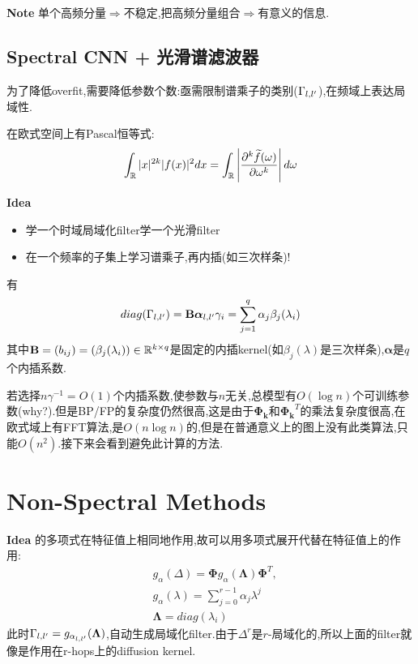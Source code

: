 \documentclass{article}
\begin{document}
\textbf{Note} 单个高频分量$\Rightarrow$不稳定,把高频分量组合$\Rightarrow$有意义的信息.

\subsection{Spectral CNN + 光滑谱滤波器}
为了降低overfit,需要降低参数个数:亟需限制谱乘子的类别($\Gamma_{l,l'}$),在频域上表达局域性.

在欧式空间上有Pascal恒等式:
\begin{align}
    \int_{\mathbb{R}}|x|^{2k}|f(x)|^2dx=\int_{\mathbb{R}}\left|\frac{\partial^k \widetilde{f}(\omega)}{\partial\omega^k}\right|d\omega
\end{align}

\textbf{Idea} \begin{itemize}
    \item 学一个时域局域化filter\tRarr 学一个光滑filter
    \item 在一个频率的子集上学习谱乘子,再内插(如三次样条)!
\end{itemize} 

有
\begin{align}
    diag(\Gamma_{l,l'})=\mathbf{B}\boldsymbol{\alpha}_{l,l'}
    \gamma_i=\sum_{j=1}^q \alpha_j \beta_j(\lambda_i)
\end{align}
其中$\mathbf{B}=(b_{ij})=(\beta_j(\lambda_i))\in \mathbb{R}^{k\times q}$是固定的内插kernel(如$\beta_j(\lambda)$是三次样条),$\boldsymbol{\alpha}$是$q$个内插系数.

若选择$n\gamma^{-1}=O(1)$个内插系数,使参数与$n$无关,总模型有$O(\log n)$个可训练参数(why?).但是BP/FP的复杂度仍然很高,这是由于$\boldsymbol{\Phi_k}$和$\boldsymbol{\Phi_k}^T$的乘法复杂度很高,在欧式域上有FFT算法,是$O(n\log n)$的,但是在普通意义上的图上没有此类算法,只能$O(n^2)$.\tRarr 接下来会看到避免此计算的方法.

\section{Non-Spectral Methods}

\textbf{Idea} \lop 的多项式在特征值上相同地作用,故可以用多项式展开代替在特征值上的作用:
\begin{align}
    &g_\alpha(\Delta)=\boldsymbol{\Phi}g_\alpha (\boldsymbol{\Lambda})\boldsymbol{\Phi}^T,\\
    &g_\alpha(\lambda)=\sum_{j=0}^{r-1}\alpha_j \lambda^j\\
    &\boldsymbol{\Lambda}=diag(\lambda_i)
\end{align}
此时$\Gamma_{l,l'}=g_{\alpha_{l,l'}}(\boldsymbol{\Lambda})$,自动生成局域化filter.由于$\Delta^r$是$r$-局域化的,所以上面的filter就像是作用在r-hops上的diffusion kernel.
\end{document}
